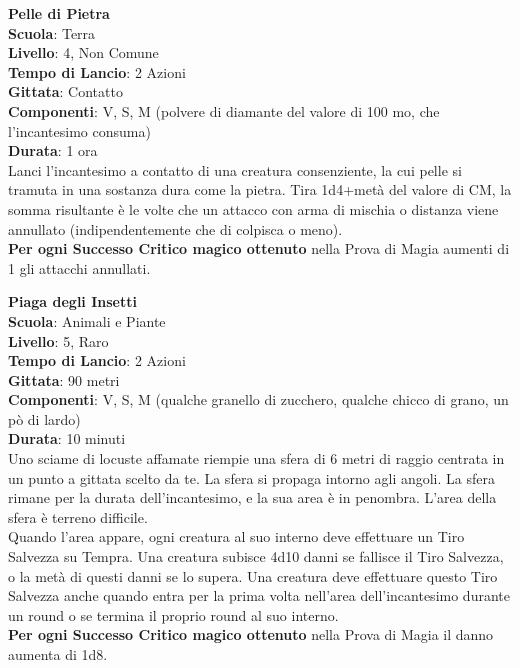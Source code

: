 \begin{multicols}{2}
\medskip\textbf{Pelle di Pietra}\\
\textbf{Scuola}: Terra\\
\textbf{Livello}: 4, Non Comune\\
\textbf{Tempo di Lancio}: 2 Azioni\\
\textbf{Gittata}: Contatto\\
\textbf{Componenti}: V, S, M (polvere di diamante del valore di 100 mo, che l'incantesimo consuma)\\
\textbf{Durata}: 1 ora\\
Lanci l'incantesimo a contatto di una creatura consenziente, la cui pelle si tramuta in una sostanza dura come la pietra. Tira 1d4+metà del valore di CM, la somma risultante è le volte che un attacco con arma di mischia o distanza viene annullato (indipendentemente che di colpisca o meno).\\
\textbf{Per ogni Successo Critico magico ottenuto} nella Prova di Magia aumenti di 1 gli attacchi annullati.

\medskip\textbf{Piaga degli Insetti}\\
\textbf{Scuola}: Animali e Piante\\
\textbf{Livello}: 5, Raro\\
\textbf{Tempo di Lancio}: 2 Azioni\\
\textbf{Gittata}: 90 metri\\
\textbf{Componenti}: V, S, M (qualche granello di zucchero, qualche chicco di grano, un pò di lardo)\\
\textbf{Durata}: 10 minuti\\
Uno sciame di locuste affamate riempie una sfera di 6 metri di raggio centrata in un punto a gittata scelto da te. La sfera si propaga intorno agli angoli. La sfera rimane per la durata dell'incantesimo, e la sua area è in penombra. L'area della sfera è terreno difficile.\\
Quando l'area appare, ogni creatura al suo interno deve effettuare un Tiro Salvezza su Tempra. Una creatura subisce 4d10 danni se fallisce il Tiro Salvezza, o la metà di questi danni se lo supera. Una creatura deve effettuare questo Tiro Salvezza anche quando entra per la prima volta nell'area dell'incantesimo durante un round o se termina il proprio round al suo interno.\\
\textbf{Per ogni Successo Critico magico ottenuto} nella Prova di Magia il danno aumenta di 1d8.


\end{multicols}

